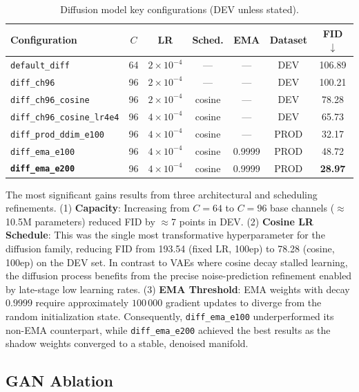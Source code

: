 \documentclass[runningheads]{llncs}
\begin{document}
\begin{table}[htbp]
\caption{Diffusion model key configurations (DEV unless stated).}\label{tab:diff_ablation}
\centering
\begin{tabular}{lcccccc}
\toprule
Configuration & $C$ & LR & Sched. & EMA & Dataset & FID $\downarrow$ \\
\midrule
\texttt{default\_diff}             & 64 & $2{\times}10^{-4}$ & ---      & ---      & DEV  & 106.89 \\
\texttt{diff\_ch96}                & 96 & $2{\times}10^{-4}$ & ---      & ---      & DEV  & 100.21 \\
\texttt{diff\_ch96\_cosine}        & 96 & $2{\times}10^{-4}$ & cosine & ---      & DEV  & 78.28  \\
\texttt{diff\_ch96\_cosine\_lr4e4} & 96 & $4{\times}10^{-4}$ & cosine & ---      & DEV  & 65.73  \\
\texttt{diff\_prod\_ddim\_e100}    & 96 & $4{\times}10^{-4}$ & cosine & ---      & PROD & 32.17  \\
\texttt{diff\_ema\_e100}           & 96 & $4{\times}10^{-4}$ & cosine & 0.9999 & PROD & 48.72  \\
\textbf{\texttt{diff\_ema\_e200}}  & 96 & $4{\times}10^{-4}$ & cosine & 0.9999 & PROD & \textbf{28.97} \\
\bottomrule
\end{tabular}
\end{table}

The most significant gains results from three architectural and scheduling refinements. (1) \textbf{Capacity}: Increasing from $C=64$ to $C=96$ base channels ($\approx$10.5M parameters) reduced FID by $\approx$7 points in DEV. (2) \textbf{Cosine LR Schedule}: This was the single most transformative hyperparameter for the diffusion family, reducing FID from 193.54 (fixed LR, 100ep) to 78.28 (cosine, 100ep) on the DEV set. In contrast to VAEs where cosine decay stalled learning, the diffusion process benefits from the precise noise-prediction refinement enabled by late-stage low learning rates. (3) \textbf{EMA Threshold}: EMA weights with decay $0.9999$ require approximately $100\,000$ gradient updates to diverge from the random initialization state. Consequently, \texttt{diff\_ema\_e100} underperformed its non-EMA counterpart, while \texttt{diff\_ema\_e200} achieved the best results as the shadow weights converged to a stable, denoised manifold.

\subsection{GAN Ablation}
\end{document}
